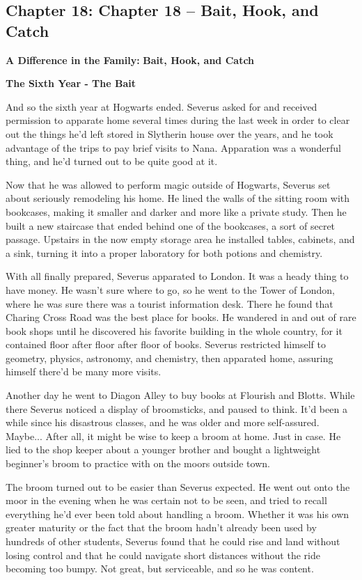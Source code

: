 \documentclass[a4paper,11pt]{article}
\begin{document}
\subsection{Chapter 18: Chapter 18 – Bait, Hook, and Catch}

\textbf{A Difference in the Family: }\textbf{Bait, Hook, and Catch}

\textbf{The Sixth Year - The Bait}

And so the sixth year at Hogwarts ended. Severus asked for and received permission to apparate home several times during the last week in order to clear out the things he'd left stored in Slytherin house over the years, and he took advantage of the trips to pay brief visits to Nana. Apparation was a wonderful thing, and he'd turned out to be quite good at it.

Now that he was allowed to perform magic outside of Hogwarts, Severus set about seriously remodeling his home. He lined the walls of the sitting room with bookcases, making it smaller and darker and more like a private study. Then he built a new staircase that ended behind one of the bookcases, a sort of secret passage. Upstairs in the now empty storage area he installed tables, cabinets, and a sink, turning it into a proper laboratory for both potions and chemistry.

With all finally prepared, Severus apparated to London. It was a heady thing to have money. He wasn't sure where to go, so he went to the Tower of London, where he was sure there was a tourist information desk. There he found that Charing Cross Road was the best place for books. He wandered in and out of rare book shops until he discovered his favorite building in the whole country, for it contained floor after floor after floor of books. Severus restricted himself to geometry, physics, astronomy, and chemistry, then apparated home, assuring himself there'd be many more visits.

Another day he went to Diagon Alley to buy books at Flourish and Blotts. While there Severus noticed a display of broomsticks, and paused to think. It'd been a while since his disastrous classes, and he was older and more self-assured. Maybe... After all, it might be wise to keep a broom at home. Just in case. He lied to the shop keeper about a younger brother and bought a lightweight beginner's broom to practice with on the moors outside town.

The broom turned out to be easier than Severus expected. He went out onto the moor in the evening when he was certain not to be seen, and tried to recall everything he'd ever been told about handling a broom. Whether it was his own greater maturity or the fact that the broom hadn't already been used by hundreds of other students, Severus found that he could rise and land without losing control and that he could navigate short distances without the ride becoming too bumpy. Not great, but serviceable, and so he was content.
\end{document}
